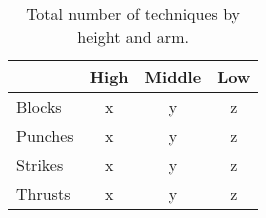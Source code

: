 \documentclass[10pt,twocolumn,a4paper]{article}
\begin{document}
\begin{table}
  \centering
  \begin{tabular}{l|c|c|c} \hline \hline
    & High & Middle & Low \\ \hline

    Blocks    & x   & y   & z \\
    Punches   & x   & y   & z \\
    Strikes   & x   & y   & z \\
    Thrusts   & x   & y   & z \\
    \hline

  \end{tabular}
  \caption{Total number of techniques by height and arm.}
  \end{table}


\end{document}
